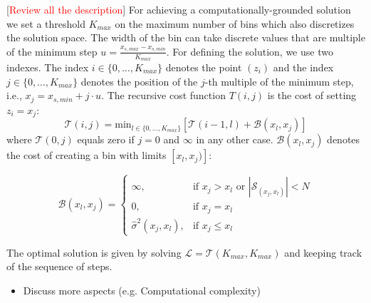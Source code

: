 \documentclass[twoside]{article}
\newcommand{\todo}[1]{[\textcolor{red}{#1}]}
\begin{document}
\todo{Review all the description}
For achieving a computationally-grounded solution we set a threshold
\(K_{max}\) on the maximum number of bins which also discretizes the
solution space. The width of the bin can take discrete values that are
multiple of the minimum step
\(u = \frac{x_{s, max} - x_{s, min}}{K_{max}}\). For defining the
solution, we use two indexes. The index
\(i \in \{0, \ldots, K_{max}\}\) denotes the point \((z_i)\) and the
index \(j \in \{0, \ldots, K_{max}\} \) denotes the position of the
\(j\)-th multiple of the minimum step, i.e., 
\(x_j = x_{s,min} + j \cdot u\). The recursive cost function
\(T(i,j)\) is the cost of setting \(z_i=x_j\):
\begin{equation}
  \label{eq:recursive_cost}
  \mathcal{T}(i,j) = \mathrm{min}_{l \in \{0, \ldots, K_{max}\}} \left [ \mathcal{T}(i-1, l) + \mathcal{B}(x_l, x_j) \right ]
\end{equation}
%
where \(\mathcal{T}(0,j)\) equals zero if \(j=0\) and \(\infty\) in
any other case. \(\mathcal{B}(x_l, x_j)\) denotes the cost of creating a bin
with limits \([x_l, x_j)]\):

\begin{equation}
  \label{eq:cost_step}
  \mathcal{B}(x_l, x_j) = \begin{cases}
                            \infty, & \text{if $x_j > x_l$ or \(|\mathcal{S}_{(x_j, x_l)}| < N\)}\\
                            0, & \text{if $x_j = x_l$}\\
                            \hat{\sigma}^2(x_j, x_l), &\text{if $x_j \leq x_l$}
  \end{cases}
\end{equation}

The optimal solution is given by solving
\(\mathcal{L} = \mathcal{T}(K_{max}, K_{max})\) and keeping track of the sequence of
steps. 

\noindent

\begin{itemize}
\item Discuss more aspects (e.g. Computational complexity)
\end{itemize}
\end{document}
